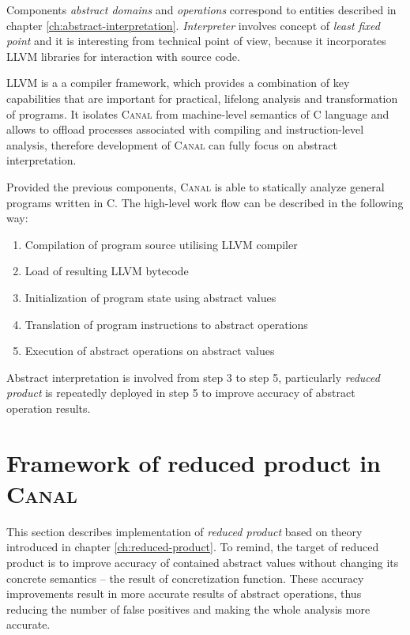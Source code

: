 \documentclass[12pt,oneside]{fithesis2}
\theoremstyle{definition}
\begin{document}
Components \textit{abstract domains} and \textit{operations} correspond to entities described in chapter \ref{ch:abstract-interpretation}. \textit{Interpreter} involves concept of \textit{least fixed point} and it is interesting from technical point of view, because it incorporates LLVM libraries for interaction with source code.

LLVM is a a compiler framework, which provides a combination of key capabilities that are important for practical, lifelong analysis and
transformation of programs. \cite{llvm} It isolates \textsc{Canal} from machine-level semantics of C language and allows to offload processes associated with compiling and instruction-level analysis, therefore development of \textsc{Canal} can fully focus on abstract interpretation.

Provided the previous components, \textsc{Canal} is able to statically analyze general programs written in C. The high-level work flow can be described in the following way:

\begin{enumerate}
  \item Compilation of program source utilising LLVM compiler
  \item Load of resulting LLVM bytecode
  \item Initialization of program state using abstract values
  \item Translation of program instructions to abstract operations
  \item Execution of abstract operations on abstract values
\end{enumerate}

Abstract interpretation is involved from step 3 to step 5, particularly \textit{reduced product} is repeatedly deployed in step 5 to improve accuracy of abstract operation results.

\section{Framework of reduced product in \textsc{Canal}}

This section describes implementation of \textit{reduced product} based on theory introduced in chapter \ref{ch:reduced-product}. To remind, the target of reduced product is to improve accuracy of contained abstract values without changing its concrete semantics -- the result of concretization function. These accuracy improvements result in more accurate results of abstract operations, thus reducing the number of false positives and making the whole analysis more accurate.
\end{document}

